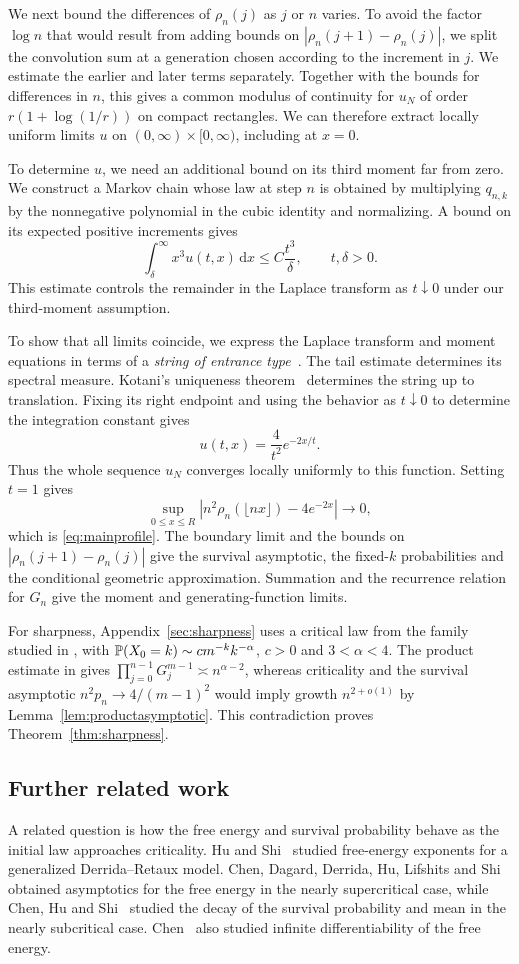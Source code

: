 \documentclass[11pt,letterpaper,reqno]{amsart}
\numberwithin{equation}{section}
\theoremstyle{plain}
\theoremstyle{remark}
\newcommand{\dd}{\,\mathrm d}
\newcommand{\floor}[1]{\lfloor#1\rfloor}
\begin{document}
We next bound the differences of $\rho_n(j)$ as $j$ or $n$ varies. To avoid the factor $\log n$ that would result from adding bounds on $|\rho_n(j+1)-\rho_n(j)|$, we split the convolution sum at a generation chosen according to the increment in $j$. We estimate the earlier and later terms separately. Together with the bounds for differences in $n$, this gives a common modulus of continuity for $u_N$ of order $r(1+\log(1/r))$ on compact rectangles. We can therefore extract locally uniform limits $u$ on $(0,\infty)\times[0,\infty)$, including at $x=0$.

To determine $u$, we need an additional bound on its third moment far from zero. We construct a Markov chain whose law at step $n$ is obtained by multiplying $q_{n,k}$ by the nonnegative polynomial in the cubic identity and normalizing. A bound on its expected positive increments gives
\[
 \int_\delta^\infty x^3u(t,x)\dd x\le C\frac{t^3}{\delta},
 \qquad t,\delta>0.
\]
This estimate controls the remainder in the Laplace transform as $t\downarrow0$ under our third-moment assumption.

To show that all limits coincide, we express the Laplace transform and moment equations in terms of a \emph{string of entrance type}~\cite{Kotani}. The tail estimate determines its spectral measure. Kotani's uniqueness theorem~\cite[Theorem~1]{Kotani} determines the string up to translation. Fixing its right endpoint and using the behavior as $t\downarrow0$ to determine the integration constant gives
\[
 u(t,x)=\frac4{t^2}e^{-2x/t}.
\]
Thus the whole sequence $u_N$ converges locally uniformly to this function. Setting $t=1$ gives
\[
 \sup_{0\le x\le R}\left|n^2\rho_n(\floor{nx})-4e^{-2x}\right|
 \longrightarrow0,
\]
which is \eqref{eq:mainprofile}. The boundary limit and the bounds on $|\rho_n(j+1)-\rho_n(j)|$ give the survival asymptotic, the fixed-$k$ probabilities and the conditional geometric approximation. Summation and the recurrence relation for $G_n$ give the moment and generating-function limits.

For sharpness, Appendix~\ref{sec:sharpness} uses a critical law from the family studied in \cite{CDDHLS,CS}, with $\mathbb P(X_0=k)\sim c m^{-k}k^{-\alpha}$, $c>0$ and $3<\alpha<4$. The product estimate in \cite[Theorem~1.1]{CS} gives $\prod_{j=0}^{n-1}G_j^{m-1}\asymp n^{\alpha-2}$, whereas criticality and the survival asymptotic $n^2p_n\to4/(m-1)^2$ would imply growth $n^{2+o(1)}$ by Lemma~\ref{lem:productasymptotic}. This contradiction proves Theorem~\ref{thm:sharpness}.

\subsection{Further related work}
A related question is how the free energy and survival probability behave as the initial law approaches criticality. Hu and Shi~\cite{HS} studied free-energy exponents for a generalized Derrida--Retaux model. Chen, Dagard, Derrida, Hu, Lifshits and Shi~\cite{CDDHLS} obtained asymptotics for the free energy in the nearly supercritical case, while Chen, Hu and Shi~\cite{CHSdual} studied the decay of the survival probability and mean in the nearly subcritical case. Chen~\cite{ChenSmooth} also studied infinite differentiability of the free energy.
\end{document}
